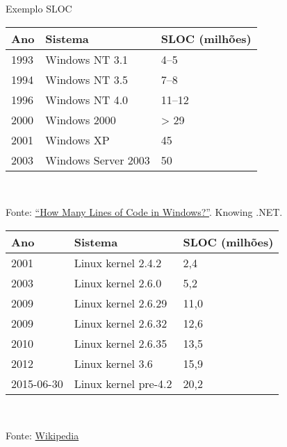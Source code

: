 \begin{frame}{Exemplo SLOC}\scriptsize

\begin{center}
\begin{tabular}{l|l|l}
\bf\hfil Ano &\bf\hfil	Sistema &\bf\hfil SLOC (milhões) \\\hline
1993&	Windows NT 3.1&	4--5\\
1994&	Windows NT 3.5&	7--8\\
1996&	Windows NT 4.0&	11--12\\
2000&	Windows 2000&	> 29\\
2001&	Windows XP&	45\\
2003&	Windows Server 2003 &	50\\\hline
\end{tabular}\\
\end{center}
{\scriptsize Fonte: \href{http://www.knowing.net/index.php/2005/12/06/how-many-lines-of-code-in-windows/}{``How Many Lines of Code in Windows?''}. Knowing .NET. }

\pause\bigskip
\begin{center}
\begin{tabular}{l|l|l}\hline
\bf\hfil Ano & \bf\hfil Sistema & SLOC (milhões) \\\hline
  2001&	Linux kernel 2.4.2&	2,4\\
  2003&	Linux kernel 2.6.0&	5,2\\
  2009&	Linux kernel 2.6.29&	11,0\\
  2009&	Linux kernel 2.6.32&	12,6\\
  2010&	Linux kernel 2.6.35&	13,5\\
  2012&	Linux kernel 3.6&	15,9\\
  2015-06-30&	Linux kernel pre-4.2&	20,2\\\hline
\end{tabular}\\
\end{center}
{\scriptsize Fonte: \href{https://en.wikipedia.org/wiki/Source_lines_of_code}{Wikipedia}}
\end{frame}

